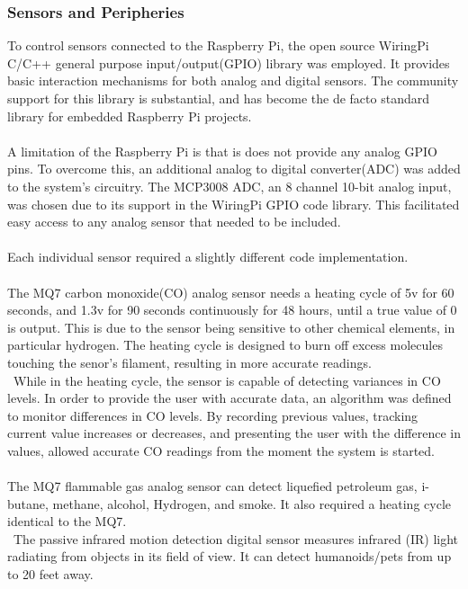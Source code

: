 \documentclass{article}
\begin{document}
\subsubsection{Sensors and Peripheries}
To control sensors connected to the Raspberry Pi, the open source WiringPi C/C++ general purpose input/output(GPIO) library was employed. It provides basic interaction mechanisms for both analog and digital sensors. The community support for this library is substantial, and has become the de facto standard library for embedded Raspberry Pi projects. \\\\
A limitation of the Raspberry Pi is that is does not provide any analog GPIO pins. To overcome this, an additional analog to digital converter(ADC) was added to the system’s circuitry. The MCP3008 ADC, an 8 channel 10-bit analog input,  was chosen due to its support in the WiringPi GPIO code library. This facilitated easy access to any analog sensor that needed to be included. \\\\
Each individual sensor required a slightly different code implementation. \\\\
The MQ7 carbon monoxide(CO) analog sensor needs a heating cycle of 5v for 60 seconds, and 1.3v for 90 seconds continuously for 48 hours, until a true value of 0 is output. This is due to the sensor being sensitive to other chemical elements, in particular hydrogen. The heating cycle is designed to burn off excess molecules touching the senor’s filament, resulting in more accurate readings. \\\ While in the heating cycle, the sensor is capable of detecting variances in CO levels. In order to provide the user with accurate data, an algorithm was defined to monitor differences in CO levels. By recording previous values, tracking current value increases or decreases, and presenting the user with the difference in values, allowed accurate CO readings from the moment the system is started. \\\\
The MQ7 flammable gas analog sensor can detect liquefied petroleum gas, i-butane, methane, alcohol, Hydrogen, and smoke. It also required a heating cycle identical to the MQ7. \\\
The passive infrared motion detection digital sensor measures infrared (IR) light radiating from objects in its field of view. It can detect humanoids/pets from up to 20 feet away. \\\\
\end{document}
